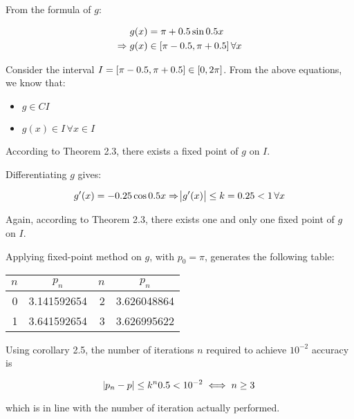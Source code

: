 \documentclass[../../../../Assignments]{subfiles}
\begin{document}
\begin{solution}
    From the formula of \(g\):

    \begin{align*}
                    g(x) & = \pi + \num{0.5} \sin{\num{0.5} x} \\
        \Rightarrow g(x) & \in \interval{\pi - \num{0.5}}{\pi + \num{0.5}} \, \forall x
    \end{align*}

    Consider the interval \(I = \interval{\pi - \num{0.5}}{\pi + \num{0.5}} \in
    \interval{0}{2 \pi}\). From the above equations, we know that:

    \begin{itemize}
        \item \(g \in C I\)
        \item \(g(x) \in I \, \forall x \in I\)
    \end{itemize}

    According to Theorem 2.3, there exists a fixed point of \(g\) on \(I\).

    Differentiating \(g\) gives:

    \[g'(x) = -\num{0.25} \cos{\num{0.5} x} \Rightarrow \abs{g'(x)} \leq k = \num{0.25} < 1 \, \forall x\]

    Again, according to Theorem 2.3, there exists one and only one fixed point
    of \(g\) on \(I\).

    Applying fixed-point method on \(g\), with \(p_0 = \pi\), generates the
    following table:

    \begin{table}[H]
        \centering
        \begin{tabular}{r S[table-format=1.9] r S[table-format=1.9]}
            \toprule
            \(n\)  &   {\(p_n\)}   &  \(n\)  &   {\(p_n\)}   \\
              &  3.141592654  &      2  &  3.626048864  \\
                1  &  3.641592654  &      3  &  3.626995622  \\
            \bottomrule
        \end{tabular}
    \end{table}

    Using corollary 2.5, the number of iterations \(n\) required to achieve
    \(10^{-2}\) accuracy is

    \[\abs{p_n - p} \leq k^n \num{0.5} < 10^{-2} \iff n \geq 3\]

    \noindent which is in line with the number of iteration actually performed.
\end{solution}
\end{document}
